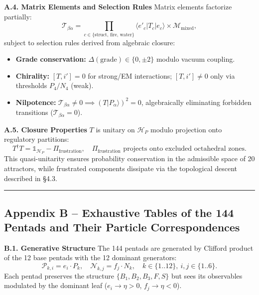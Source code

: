 \documentclass[11pt]{article}
\providecommand{\tightlist}{\setlength{\itemsep}{2pt}\setlength{\parskip}{6pt}}
\let\oldmathcal\mathcal
\renewcommand{\mathcal}[1]{\oldmathcal{#1}}
\providecommand{\tightlist}{%
  \setlength{\itemsep}{2pt}\setlength{\parskip}{6pt}
}
\begin{document}
\textbf{A.4. Matrix Elements and Selection Rules} Matrix elements
factorize partially: \[
\mathcal{T}_{\beta\alpha} = \prod_{c \in \{\text{struct, fire, water}\}} \langle e'_{c} | T_c | e_{c} \rangle \times \mathcal{M}_{\text{mixed}},
\] subject to selection rules derived from algebraic closure:

\begin{itemize}
\tightlist
\item
  \textbf{Grade conservation:} \(\Delta(\text{grade}) \in \{0, \pm 2\}\)
  modulo vacuum coupling.
\item
  \textbf{Chirality:} \([T, i'] = 0\) for strong/EM interactions;
  \([T, i'] \neq 0\) only via thresholds \(P_4/N_4\) (weak).
\item
  \textbf{Nilpotence:}
  \(\mathcal{T}_{\beta\alpha} \neq 0 \implies (T|P_\alpha\rangle)^2 = 0\),
  algebraically eliminating forbidden transitions
  (\(\mathcal{T}_{\beta\alpha}=0\)).
\end{itemize}

\textbf{A.5. Closure Properties} \(T\) is unitary on \(\mathcal{H}_P\)
modulo projection onto regulatory partitions: \[
T^\dagger T = \mathbb{1}_{\mathcal{H}_P} - \Pi_{\text{frustration}}, \quad \Pi_{\text{frustration}} \text{ projects onto excluded octahedral zones}.
\] This quasi-unitarity ensures probability conservation in the
admissible space of 20 attractors, while frustrated components dissipate
via the topological descent described in §4.3.

\begin{center}\rule{0.5\linewidth}{0.5pt}\end{center}

\hypertarget{appendix-b-exhaustive-tables-of-the-144-pentads-and-their-particle-correspondences}{%
\subsection{Appendix B -- Exhaustive Tables of the 144 Pentads and Their
Particle
Correspondences}\label{appendix-b-exhaustive-tables-of-the-144-pentads-and-their-particle-correspondences}}

\textbf{B.1. Generative Structure} The 144 pentads are generated by
Clifford product of the 12 base pentads with the 12 dominant generators:
\[
\mathcal{P}_{k,i} = e_i \cdot P_k, \quad \mathcal{N}_{k,j} = f_j \cdot N_k, \quad k\in\{1..12\},\ i,j\in\{1..6\}.
\] Each pentad preserves the structure \(\{B_1,B_2,B_3,F,S\}\) but sees
its observables modulated by the dominant leaf (\(e_i \to \eta>0\),
\(f_j \to \eta<0\)).
\end{document}
